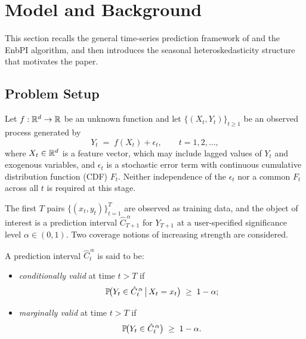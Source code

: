 \section{Model and Background}
\label{sec:model}

This section recalls the general time-series prediction framework of
\citet{xu2023conformal} and the EnbPI algorithm, and then introduces
the seasonal heteroskedasticity structure that motivates the paper.

\subsection{Problem Setup}
\label{sec:model:setup}

Let $f:\mathbb{R}^{d}\to\mathbb{R}$ be an unknown function and let
$\{(X_t, Y_t)\}_{t \geq 1}$ be an observed process generated by
%
\begin{equation}
  \label{eq:dgp}
  Y_t \;=\; f(X_t) + \epsilon_t, \qquad t = 1, 2, \ldots,
\end{equation}
%
where $X_t \in \mathbb{R}^d$ is a feature vector, which may include lagged
values of $Y_t$ and exogenous variables, and $\epsilon_t$ is a
stochastic error term with continuous cumulative distribution
function (CDF) $F_t$.  Neither independence of the $\epsilon_t$ nor
a common $F_t$ across all $t$ is required at this stage.

The first $T$ pairs $\{(x_t, y_t)\}_{t=1}^T$ are observed as training
data, and the object of interest is a prediction interval
$\hat{C}_{T+1}^{\,\alpha}$ for $Y_{T+1}$ at a user-specified
significance level $\alpha \in (0,1)$.  Two coverage notions of
increasing strength are considered.

\begin{definition}
\label{def:coverage}
A prediction interval $\hat{C}_t^{\,\alpha}$ is said to be:
\begin{itemize}
  \item \textit{conditionally valid} at time $t > T$ if
  \begin{equation}
    \label{eq:cond_coverage}
    \mathbb{P}\!\bigl(Y_t \in \hat{C}_t^{\,\alpha} \,\big|\, X_t = x_t\bigr)
    \;\geq\; 1 - \alpha;
  \end{equation}

  \item \textit{marginally valid} at time $t > T$ if
  \begin{equation}
    \label{eq:marg_coverage}
    \mathbb{P}\!\bigl(Y_t \in \hat{C}_t^{\,\alpha}\bigr)
    \;\geq\; 1 - \alpha.
  \end{equation}
\end{itemize}
\end{definition}

